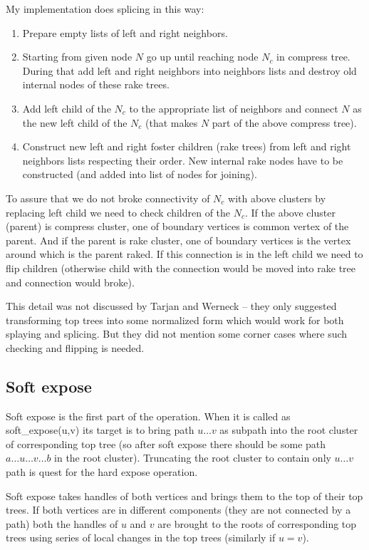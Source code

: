 My implementation does splicing in this way:
\begin{enumerate}
\item Prepare empty lists of left and right neighbors.
\item Starting from given node $N$ go up until reaching node $N_c$ in compress
tree. During that add left and right neighbors into neighbors lists and destroy
old internal nodes of these rake trees.
\item Add left child of the $N_c$ to the appropriate list of neighbors and
connect $N$ as the new left child of the $N_c$ (that makes $N$ part of the above
compress tree).
\item Construct new left and right foster children (rake trees) from left and
right neighbors lists respecting their order. New internal rake nodes have
to be constructed (and added into list of nodes for joining).
\end{enumerate}

To assure that we do not broke connectivity of $N_c$ with above clusters by
replacing left child we need to check children of the $N_c$. If the above
cluster (parent) is compress cluster, one of boundary vertices is common vertex
of the parent. And if the parent is rake cluster, one of boundary vertices is
the vertex around which is the parent raked. If this connection is in the left
child we need to flip children (otherwise child with the connection would be
moved into rake tree and connection would broke).

This detail was not discussed by Tarjan and Werneck -- they only suggested
transforming top trees into some normalized form which would work for both
splaying and splicing. But they did not mention some corner cases where such
checking and flipping is needed.

\subsection{Soft expose}

Soft expose is the first part of the \Expose{} operation. When it is called as
{\I soft\_expose(u,v)} its target is to bring path $u\dots v$ as subpath into
the root cluster of corresponding top tree (so after soft expose there should
be some path $a\dots u\dots v\dots b$ in the root cluster). Truncating the root
cluster to contain only $u\dots v$ path is quest for the hard expose operation.

Soft expose takes handles of both vertices and brings them to the top of their
top trees. If both vertices are in different components (they are not connected
by a path) both the handles of $u$ and $v$ are brought to the roots of
corresponding top trees using series of local changes in the top trees
(similarly if $u=v$).

